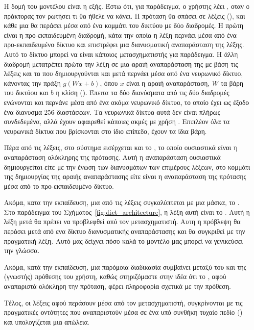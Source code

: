 Η δομή του μοντέλου είναι η εξής. Έστω ότι, για παράδειγμα, ο χρήστης λέει , οταν ο πράκτορας τον ρωτήσει τι θα ήθελε να κάνει. Η πρόταση θα σπάσει σε λέξεις (), και κάθε μια θα περάσει μέσα από ένα κομμάτι του δικτύου με δύο διαδρομές. Η πρώτη είναι η προ-εκπαιδευμένη διαδρομή, κάτα την οποία η λέξη περνάει μέσα από ένα προ-εκπαιδευμένο δίκτυο και επιστρέφει μια διανυσματική αναπαράσταση της λέξης. Αυτό το δίκτυο μπορεί να είναι κάποιος μετασχηματιστής για παράδειγμα. Η άλλη διαδρομή μετατρέπει πρώτα την λέξη σε μια αραιή αναπαράσταση της με βάση τις λέξεις και τα  που δημιουργούνται και μετά περνάει μέσα από ένα νευρωνικό δίκτυο, κάνοντας την πράξη $g(Wx + b)$, όπου $x$ είναι η αραιή αναπαράσταση, $W$ τα βάρη του δικτύου και $b$ η κλίση (). Έπειτα τα δύο διανύσματα από τις δύο διαδρομές ενώνονται και περνάνε μέσα από ένα ακόμα νευρωνικό δίκτυο, το οποίο έχει ως έξοδο ένα διανυσμα 256 διαστάσεων. Τα νευρωνικά δίκτυα αυτά δεν είναι πλήρως συνδεδεμένα, αλλά έχουν αφαιρεθεί κάποιες ακμές με χρήση . Επιπλέον όλα τα νευρωνικά δίκτυα που βρίσκονται στο ίδιο επίπεδο, έχουν τα ίδια βάρη.

Πέρα από τις λέξεις, στο σύστημα εισέρχεται και το , το οποίο ουσιαστικά είναι η αναπαράσταση ολόκληρης της πρότασης. Αυτή η αναπαράσταση ουσιαστικά δημιουργείται είτε με την ένωση των διανυσμάτων των επιμέρους λέξεων, στο κομμάτι της δημιουργίας της αραιής αναπαράστασης είτε είναι η αναπαράσταση της πρότασης μέσα από το προ-εκπαιδευμένο δίκτυο.

Ακόμα, κατα την εκπαίδευση, μια από τις λέξεις συγκαλύπτεται με μια μάσκα, το . Στο παράδειγμα του Σχήματος~\ref{fig:diet_architecture}, η λέξη αυτή είναι το . Αυτή η λέξη μετά θα πρέπει να προβλεφθεί από τον μετασχηματιστή. Αυτη η πρόβλεψη θα περάσει μετά από ενα δίκτυο διανυσματικής αναπαράστασης και θα συγκριθεί με την πραγματική λέξη. Αυτό μας δείχνει πόσο καλά το μοντέλο μας μπορεί να γενικεύσει την γλώσσα.

Ακόμα, κατά την εκπαίδευση, μια παρόμοια διαδικασία συμβαίνει μεταξύ του  και της (γνωστής) πρόθεσης του χρήστη, καθώς στηριζόμαστε στην ιδέα ότι το , αφού αναπαριστά ολόκληρη την πρόταση, φέρει πληροφορία σχετικά με την πρόθεση.

Τέλος, οι λέξεις αφού περάσουν μέσα από τον μετασχηματιστή, συγκρίνονται με τις πραγματικές οντότητες που αναπαριστούν μέσα σε ένα υπό συνθήκη τυχαίο πεδίο () και υπολογίζεται μια απώλεια.

